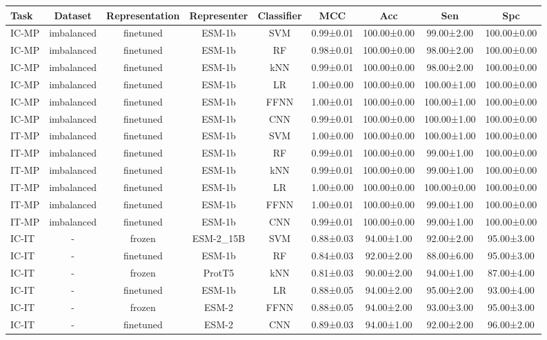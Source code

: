 \begin{tabular}{lcccccccc}
\toprule
 \textbf{Task} &    \textbf{Dataset} & \textbf{Representation} & \textbf{Representer} & \textbf{Classifier} &       \textbf{MCC} &         \textbf{Acc} &         \textbf{Sen} &         \textbf{Spc} \\
\midrule
IC-MP & imbalanced &      finetuned &      ESM-1b &        SVM & 0.99±0.01 & 100.00±0.00 &  99.00±2.00 & 100.00±0.00 \\
IC-MP & imbalanced &      finetuned &      ESM-1b &         RF & 0.98±0.01 & 100.00±0.00 &  98.00±2.00 & 100.00±0.00 \\
IC-MP & imbalanced &      finetuned &      ESM-1b &        kNN & 0.99±0.01 & 100.00±0.00 &  98.00±2.00 & 100.00±0.00 \\
IC-MP & imbalanced &      finetuned &      ESM-1b &         LR & 1.00±0.00 & 100.00±0.00 & 100.00±1.00 & 100.00±0.00 \\
IC-MP & imbalanced &      finetuned &      ESM-1b &       FFNN & 1.00±0.01 & 100.00±0.00 & 100.00±1.00 & 100.00±0.00 \\
IC-MP & imbalanced &      finetuned &      ESM-1b &        CNN & 0.99±0.01 & 100.00±0.00 & 100.00±1.00 & 100.00±0.00 \\
IT-MP & imbalanced &      finetuned &      ESM-1b &        SVM & 1.00±0.00 & 100.00±0.00 & 100.00±1.00 & 100.00±0.00 \\
IT-MP & imbalanced &      finetuned &      ESM-1b &         RF & 0.99±0.01 & 100.00±0.00 &  99.00±1.00 & 100.00±0.00 \\
IT-MP & imbalanced &      finetuned &      ESM-1b &        kNN & 0.99±0.01 & 100.00±0.00 &  99.00±1.00 & 100.00±0.00 \\
IT-MP & imbalanced &      finetuned &      ESM-1b &         LR & 1.00±0.00 & 100.00±0.00 & 100.00±0.00 & 100.00±0.00 \\
IT-MP & imbalanced &      finetuned &      ESM-1b &       FFNN & 1.00±0.01 & 100.00±0.00 &  99.00±1.00 & 100.00±0.00 \\
IT-MP & imbalanced &      finetuned &      ESM-1b &        CNN & 0.99±0.01 & 100.00±0.00 &  99.00±1.00 & 100.00±0.00 \\
IC-IT &          - &         frozen &   ESM-2\_15B &        SVM & 0.88±0.03 &  94.00±1.00 &  92.00±2.00 &  95.00±3.00 \\
IC-IT &          - &      finetuned &      ESM-1b &         RF & 0.84±0.03 &  92.00±2.00 &  88.00±6.00 &  95.00±3.00 \\
IC-IT &          - &         frozen &      ProtT5 &        kNN & 0.81±0.03 &  90.00±2.00 &  94.00±1.00 &  87.00±4.00 \\
IC-IT &          - &      finetuned &      ESM-1b &         LR & 0.88±0.05 &  94.00±2.00 &  95.00±2.00 &  93.00±4.00 \\
IC-IT &          - &         frozen &       ESM-2 &       FFNN & 0.88±0.05 &  94.00±2.00 &  93.00±3.00 &  95.00±3.00 \\
IC-IT &          - &      finetuned &       ESM-2 &        CNN & 0.89±0.03 &  94.00±1.00 &  92.00±2.00 &  96.00±2.00 \\
\bottomrule
\end{tabular}
